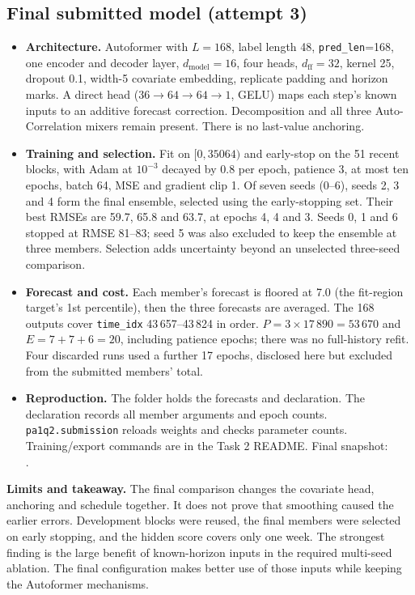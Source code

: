 \subsection{Final submitted model (attempt 3)}\label{sec:final}
\begin{itemize}
  \item \textbf{Architecture.} Autoformer with $L=168$, label length 48,
        \texttt{pred\_len}=168, one encoder and decoder layer, $d_\text{model}=16$,
        four heads, $d_\text{ff}=32$, kernel 25, dropout 0.1, width-5 covariate
        embedding, replicate padding and horizon marks. A direct head
        ($36\to64\to64\to1$, GELU) maps each step's known inputs to an additive
        forecast correction. Decomposition and all three Auto-Correlation mixers
        remain present. There is no last-value anchoring.
  \item \textbf{Training and selection.} Fit on $[0,35064)$ and early-stop on the
        51 recent blocks, with Adam at $10^{-3}$ decayed by 0.8 per epoch, patience 3,
        at most ten epochs, batch 64, MSE and gradient clip 1. Of seven seeds (0--6),
        seeds 2, 3 and 4 form the final ensemble, selected using the early-stopping
        set. Their best RMSEs are 59.7, 65.8 and 63.7, at epochs 4, 4 and 3.
        Seeds 0, 1 and 6 stopped at RMSE 81--83; seed 5 was also excluded to keep
        the ensemble at three members. Selection adds uncertainty beyond an
        unselected three-seed comparison.
  \item \textbf{Forecast and cost.} Each member's forecast is floored at 7.0 (the
        fit-region target's 1st percentile), then the three forecasts are averaged.
        The 168 outputs cover \texttt{time\_idx} 43\,657--43\,824 in order.
        $P=3\times17\,890=53\,670$ and $E=7+7+6=20$, including patience epochs;
        there was no full-history refit. Four discarded runs used a further 17 epochs,
        disclosed here but excluded from the submitted members' total.
  \item \textbf{Reproduction.} The  folder holds the forecasts
        and declaration. The declaration records all member arguments and epoch counts.
        \texttt{pa1q2.submission} reloads weights and checks parameter counts.
        Training/export commands are in the Task 2 README. Final snapshot:\\
        .
\end{itemize}

\textbf{Limits and takeaway.} The final comparison changes the covariate head,
anchoring and schedule together. It does not prove that smoothing caused the earlier
errors. Development blocks were reused, the final members were selected on early
stopping, and the hidden score covers only one week. The strongest finding is the
large benefit of known-horizon inputs in the required multi-seed ablation. The final
configuration makes better use of those inputs while keeping the Autoformer mechanisms.

